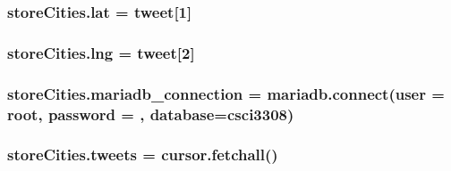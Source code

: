 \subsubsection[{\texorpdfstring{lat}{lat}}]{\setlength{\rightskip}{0pt plus 5cm}store\+Cities.\+lat = tweet\mbox{[}1\mbox{]}}\hypertarget{namespacestoreCities_abb67378575f786533b2e9e00137c0c11}{}\label{namespacestoreCities_abb67378575f786533b2e9e00137c0c11}
\subsubsection[{\texorpdfstring{lng}{lng}}]{\setlength{\rightskip}{0pt plus 5cm}store\+Cities.\+lng = tweet\mbox{[}2\mbox{]}}\hypertarget{namespacestoreCities_a991d2b6bd50ff73a116167b0ec2fb252}{}\label{namespacestoreCities_a991d2b6bd50ff73a116167b0ec2fb252}
\subsubsection[{\texorpdfstring{mariadb\+\_\+connection}{mariadb_connection}}]{\setlength{\rightskip}{0pt plus 5cm}store\+Cities.\+mariadb\+\_\+connection = mariadb.\+connect(user = \textquotesingle{}root\textquotesingle{}, password = \textquotesingle{}\textquotesingle{}, database=\textquotesingle{}csci3308\textquotesingle{})}\hypertarget{namespacestoreCities_a8f8c246ff77d060c8069df768b152c49}{}\label{namespacestoreCities_a8f8c246ff77d060c8069df768b152c49}
\subsubsection[{\texorpdfstring{tweets}{tweets}}]{\setlength{\rightskip}{0pt plus 5cm}store\+Cities.\+tweets = cursor.\+fetchall()}\hypertarget{namespacestoreCities_a7b9da38e052d859e8c0dcc3ab0c8948c}{}\label{namespacestoreCities_a7b9da38e052d859e8c0dcc3ab0c8948c}
